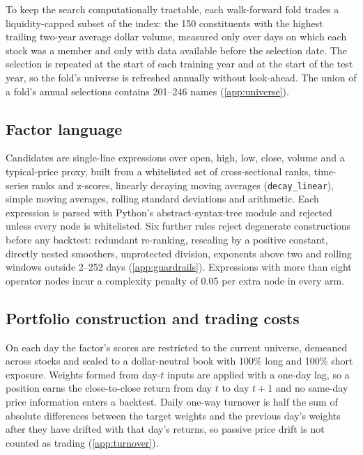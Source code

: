 \documentclass[preprint,12pt,authoryear]{elsarticle}
\begin{document}
To keep the search computationally tractable, each walk-forward fold trades a liquidity-capped subset of the index: the 150 constituents with the highest trailing two-year average dollar volume, measured only over days on which each stock was a member and only with data available before the selection date. The selection is repeated at the start of each training year and at the start of the test year, so the fold's universe is refreshed annually without look-ahead. The union of a fold's annual selections contains 201--246 names (\ref{app:universe}).

\subsection{Factor language}\label{sec:language}

Candidates are single-line expressions over open, high, low, close, volume and a typical-price proxy, built from a whitelisted set of cross-sectional ranks, time-series ranks and z-scores, linearly decaying moving averages (\texttt{decay\_linear}), simple moving averages, rolling standard deviations and arithmetic. Each expression is parsed with Python's abstract-syntax-tree module and rejected unless every node is whitelisted. Six further rules reject degenerate constructions before any backtest: redundant re-ranking, rescaling by a positive constant, directly nested smoothers, unprotected division, exponents above two and rolling windows outside 2--252 days (\ref{app:guardrails}). Expressions with more than eight operator nodes incur a complexity penalty of 0.05 per extra node in every arm.

\subsection{Portfolio construction and trading costs}\label{sec:costs}

On each day the factor's scores are restricted to the current universe, demeaned across stocks and scaled to a dollar-neutral book with 100\% long and 100\% short exposure. Weights formed from day-$t$ inputs are applied with a one-day lag, so a position earns the close-to-close return from day $t$ to day $t+1$ and no same-day price information enters a backtest. Daily one-way turnover is half the sum of absolute differences between the target weights and the previous day's weights after they have drifted with that day's returns, so passive price drift is not counted as trading (\ref{app:turnover}).
\end{document}
